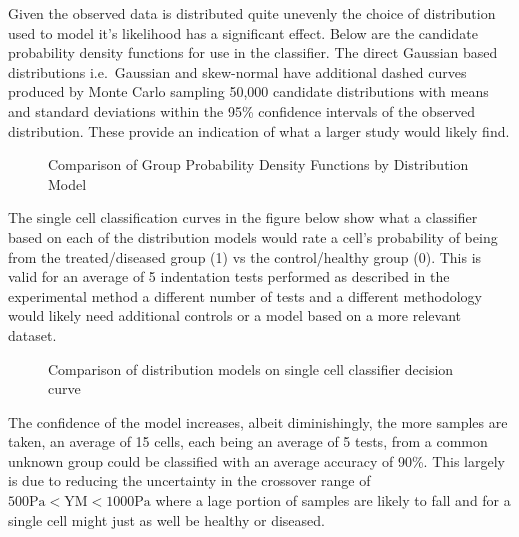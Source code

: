 \documentclass[
  paper=a4,
  ,captions=tableheading
]{scrartcl}
\makeatletter
\newcommand*\pandocbounded[1]{%
  \sbox\pandoc@box{#1}%
  \Gscale@div\@tempa{\textheight}{\dimexpr\ht\pandoc@box+\dp\pandoc@box\relax}%
  \Gscale@div\@tempb{\linewidth}{\wd\pandoc@box}%
  \ifdim\@tempb\p@<\@tempa\p@\let\@tempa\@tempb\fi%
  \ifdim\@tempa\p@<\p@\scalebox{\@tempa}{\usebox\pandoc@box}%
  \else\usebox{\pandoc@box}%
  \fi%
}
\makeatother
\begin{document}
Given the observed data is distributed quite unevenly the choice of
distribution used to model it's likelihood has a significant effect.
Below are the candidate probability density functions for use in the
classifier. The direct Gaussian based distributions i.e.~Gaussian and
skew-normal have additional dashed curves produced by Monte Carlo
sampling 50,000 candidate distributions with means and standard
deviations within the 95\% confidence intervals of the observed
distribution. These provide an indication of what a larger study would
likely find.

\begin{figure}
\centering
\pandocbounded{}
\caption{Comparison of Group Probability Density Functions by
Distribution Model}
\end{figure}

The single cell classification curves in the figure below show what a
classifier based on each of the distribution models would rate a cell's
probability of being from the treated/diseased group (1) vs the
control/healthy group (0). This is valid for an average of 5 indentation
tests performed as described in the experimental method a different
number of tests and a different methodology would likely need additional
controls or a model based on a more relevant dataset.

\begin{figure}
\centering
\pandocbounded{}
\caption{Comparison of distribution models on single cell classifier
decision curve}
\end{figure}

The confidence of the model increases, albeit diminishingly, the more
samples are taken, an average of 15 cells, each being an average of 5
tests, from a common unknown group could be classified with an average
accuracy of 90\%. This largely is due to reducing the uncertainty in the
crossover range of \(500 \text{Pa} \lt  \text{YM} \lt 1000 \text{Pa}\)
where a lage portion of samples are likely to fall and for a single cell
might just as well be healthy or diseased.
\end{document}
